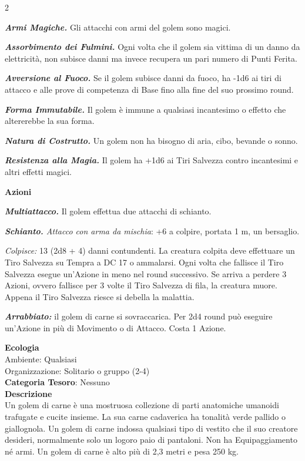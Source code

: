 \begin{multicols}{2}
{\emph{\textbf{Armi Magiche.}} Gli attacchi con armi del golem sono magici.

\emph{\textbf{Assorbimento dei Fulmini.}} Ogni volta che il golem sia vittima di un danno da elettricità, non subisce danni ma invece recupera un pari numero di Punti Ferita.

\emph{\textbf{Avversione al Fuoco.}} Se il golem subisce danni da fuoco, ha -1d6 ai tiri di attacco e alle prove di competenza di Base fino alla fine del suo prossimo round.

\emph{\textbf{Forma Immutabile.}} Il golem è immune a qualsiasi incantesimo o effetto che altererebbe la sua forma.

\emph{\textbf{Natura di Costrutto.}} Un golem non ha bisogno di aria, cibo, bevande o sonno.

\emph{\textbf{Resistenza alla Magia.}} Il golem ha +1d6 ai Tiri Salvezza contro incantesimi e altri effetti magici.

\textbf{Azioni}

\emph{\textbf{Multiattacco.}} Il golem effettua due attacchi di schianto.

\emph{\textbf{Schianto.} Attacco con arma da mischia}: +6 a colpire, portata 1 m, un bersaglio.

\emph{Colpisce:} 13 (2d8 + 4) danni contundenti. La creatura colpita deve effettuare un Tiro Salvezza su Tempra a DC 17 o ammalarsi. Ogni volta che fallisce il Tiro Salvezza esegue un'Azione in meno nel round successivo. Se arriva a perdere 3 Azioni, ovvero fallisce per 3 volte il Tiro Salvezza di fila, la creatura muore. Appena il Tiro Salvezza riesce si debella la malattia.

\emph{\textbf{Arrabbiato:}} il golem di carne si sovraccarica. Per 2d4 round può eseguire un'Azione in più di Movimento o di Attacco. Costa 1 Azione.

\textbf{Ecologia}\\
Ambiente: Qualsiasi\\
Organizzazione: Solitario o gruppo (2-4)\\
\textbf{Categoria Tesoro}: Nessuno\\
\textbf{Descrizione}\\
Un golem di carne è una mostruosa collezione di parti anatomiche umanoidi trafugate e cucite insieme. La sua carne cadaverica ha tonalità verde pallido o giallognola. Un golem di carne indossa qualsiasi tipo di vestito che il suo creatore desideri, normalmente solo un logoro paio di pantaloni. Non ha Equipaggiamento né armi. Un golem di carne è alto più di 2,3 metri e pesa 250 kg.

}
\end{multicols}
